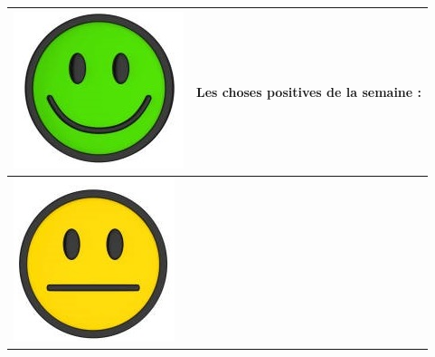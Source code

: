\documentclass[12pt,titlepage,french]{article}
\begin{document}
\noindent\begin{tabularx}{17cm}{|p{5cm}|X|}
\hline
   \begin{minipage}{.3\textwidth}
      \includegraphics[width=\linewidth]{smhappy.jpg}
    \end{minipage}
    & 
    Les choses positives de la semaine :\\
\hline
     \begin{minipage}{.3\textwidth}
      \includegraphics[width=\linewidth]{smneutral.jpg}

\end{minipage}
\end{tabularx}
\end{document}
